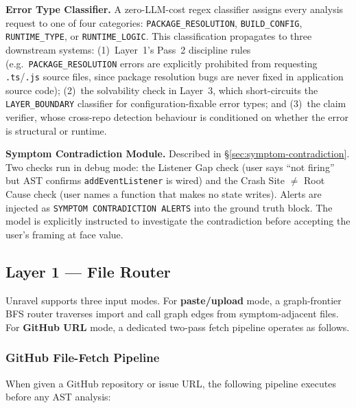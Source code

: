 \documentclass[12pt,a4paper]{article}
\newcommand{\code}[1]{\texttt{\small #1}}
\begin{document}
\vspace{6pt}
\textbf{Error Type Classifier.} A zero-LLM-cost regex classifier assigns every
analysis request to one of four categories: \code{PACKAGE\_RESOLUTION},
\code{BUILD\_CONFIG}, \code{RUNTIME\_TYPE}, or \code{RUNTIME\_LOGIC}. This
classification propagates to three downstream systems: (1)~Layer~1's Pass~2
discipline rules (e.g.\ \code{PACKAGE\_RESOLUTION} errors are explicitly prohibited
from requesting \texttt{.ts}/\texttt{.js} source files, since package resolution
bugs are never fixed in application source code); (2)~the solvability check in
Layer~3, which short-circuits the \code{LAYER\_BOUNDARY} classifier for
configuration-fixable error types; and (3)~the claim verifier, whose cross-repo
detection behaviour is conditioned on whether the error is structural or runtime.

\textbf{Symptom Contradiction Module.} Described in \S\ref{sec:symptom-contradiction}.
Two checks run in debug mode: the Listener Gap check (user says ``not firing'' but
AST confirms \code{addEventListener} is wired) and the Crash Site $\neq$ Root Cause
check (user names a function that makes no state writes). Alerts are injected as
\texttt{SYMPTOM CONTRADICTION ALERTS} into the ground truth block. The model is
explicitly instructed to investigate the contradiction before accepting the user's
framing at face value.

\clearpage
\subsection{Layer 1 — File Router}

\begin{l1box}[title={Layer 1: File Router}]
\small
Unravel supports three input modes. For \textbf{paste/upload} mode, a graph-frontier BFS
router traverses import and call graph edges from symptom-adjacent files. For
\textbf{GitHub URL} mode, a dedicated two-pass fetch pipeline operates as follows.
\end{l1box}

\subsubsection{GitHub File-Fetch Pipeline}

When given a GitHub repository or issue URL, the following pipeline executes before any
AST analysis:

\vspace{8pt}
\end{document}
